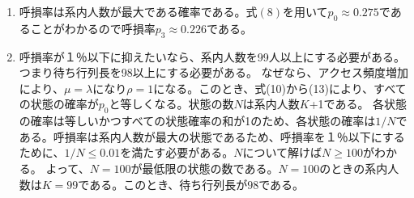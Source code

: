 \documentclass{report}
\begin{document}
\begin{CJK}{UTF8}{min}
\begin{enumerate}
        \item 呼損率は系内人数が最大である確率である。式$(8)$を用いて$p_0\approx0.275$であることがわかるので呼損率$p_3\approx 0.226$である。
        \item 呼損率が１％以下に抑えたいなら、系内人数を99人以上にする必要がある。つまり待ち行列長を98以上にする必要がある。
              なぜなら、アクセス頻度増加により、$\mu=\lambda$になり$\rho=1$になる。このとき、式(10)から(13)により、すべての状態の確率が$p_0$と等しくなる。状態の数$N$は系内人数$K$+1である。
              各状態の確率は等しいかつすべての状態確率の和が1のため、各状態の確率は$1/N$である。呼損率は系内人数が最大の状態であるため、呼損率を１％以下にするために、$1/N\leq0.01$を満たす必要がある。$N$について解けば$N\geq100$がわかる。
              よって、$N=100$が最低限の状態の数である。$N=100$のときの系内人数は$K=99$である。このとき、待ち行列長が$98$である。
    \end{enumerate}

\end{CJK}
\end{document}
